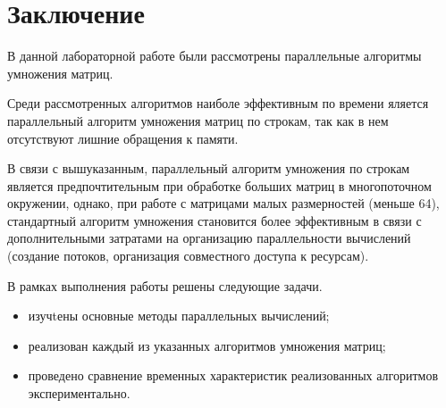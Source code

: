\chapter*{Заключение}

В данной лабораторной работе были рассмотрены параллельные алгоритмы умножения матриц. 

Среди рассмотренных алгоритмов наиболе эффективным по времени яляется параллельный алгоритм умножения матриц по строкам, так как в нем отсутствуют лишние обращения к памяти. 

В связи с вышуказанным, параллельный алгоритм умножения по строкам является предпочтительным при обработке больших матриц в многопоточном окружении, однако, при работе с матрицами малых размерностей (меньше 64), стандартный алгоритм умножения становится более эффективным в связи с дополнительными затратами на организацию параллельности вычислений (создание потоков, организация совместного доступа к ресурсам).

В рамках выполнения работы решены следующие задачи.
\begin{itemize}
	\item изучtены основные методы параллельных вычислений;
	\item реализован каждый из указанных алгоритмов умножения матриц;
	\item проведено сравнение временных характеристик реализованных алгоритмов экспериментально.
\end{itemize}